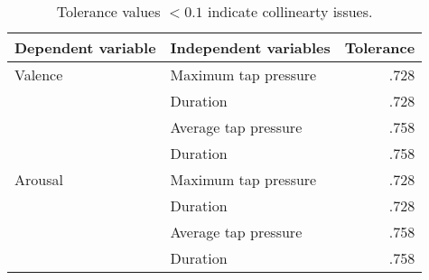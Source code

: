 \begin{table}[ht]
\centering
\begin{tabular}{@{}llr@{}}
\textbf{Dependent variable} & \textbf{Independent variables} & \textbf{Tolerance} \\ \midrule
Valence                     & Maximum tap pressure           & .728               \\
                            & Duration                       & .728               \\ \cmidrule(l){2-3} 
                            & Average tap pressure           & .758               \\
                            & Duration                       & .758               \\ \midrule
Arousal                     & Maximum tap pressure           & .728               \\
                            & Duration                       & .728               \\ \cmidrule(l){2-3} 
                            & Average tap pressure           & .758               \\
                            & Duration                       & .758              
\end{tabular}
\caption{Tolerance values $< 0.1$ indicate collinearty issues.}
\label{tab:collinearity_tolerance}
\end{table}